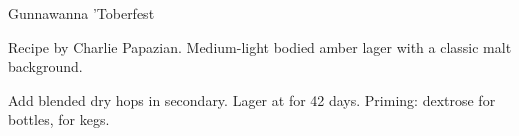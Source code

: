 \begin{recipe}{Gunnawanna 'Toberfest}

\begin{aboutblock}
Recipe by Charlie Papazian. Medium-light bodied amber lager with a classic malt
background. 
\end{aboutblock}


\begin{methodandtiming}

\begin{mashsteps}
\end{mashsteps}

\begin{fermentationsteps}
\end{fermentationsteps}

\begin{directions}
Add blended dry hops in secondary. Lager at  for 42 days. Priming: 
dextrose for bottles,  for kegs. 
\end{directions}

\end{methodandtiming}

\recipebreak

\begin{ingredientsblock}

\begin{malts}
\end{malts}

\begin{hops}
\end{hops}


\end{ingredientsblock}

\end{recipe}

